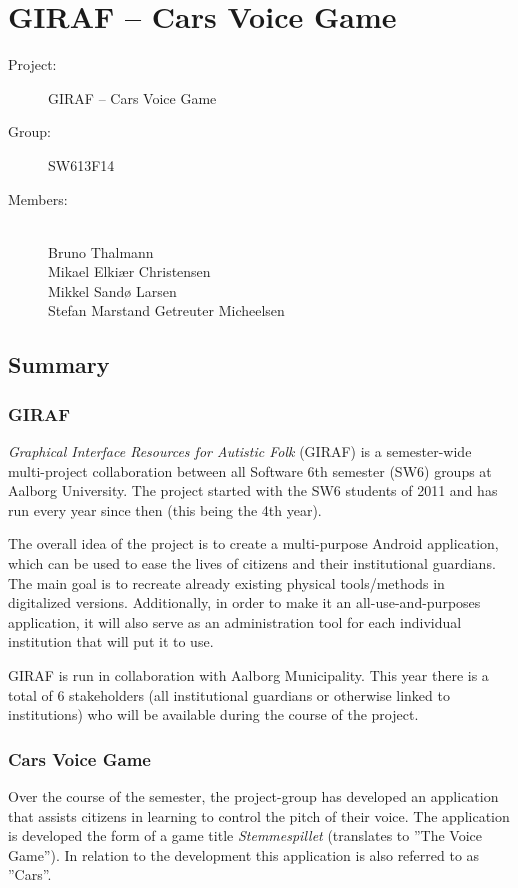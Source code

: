\documentclass[a4paper,12pt,english]{article}
\begin{document}
\section*{GIRAF -- Cars Voice Game}

\begin{description}
\item[Project:] GIRAF -- Cars Voice Game
\item[Group:] SW613F14
\item[Members:] ~ \\
	Bruno Thalmann \\
	Mikael Elki\ae r Christensen \\
	Mikkel Sand\o{} Larsen \\
	Stefan Marstand Getreuter Micheelsen
\end{description}

\subsection*{Summary}

\subsubsection*{GIRAF}
\textit{Graphical Interface Resources for Autistic Folk} (GIRAF) is a semester-wide multi-project collaboration between all Software 6th semester (SW6) groups at Aalborg University.
The project started with the SW6 students of 2011 and has run every year since then (this being the 4th year).

The overall idea of the project is to create a multi-purpose Android application, which can be used to ease the lives of citizens and their institutional guardians.
The main goal is to recreate already existing physical tools/methods in digitalized versions.
Additionally, in order to make it an all-use-and-purposes application, it will also serve as an administration tool for each individual institution that will put it to use.

GIRAF is run in collaboration with Aalborg Municipality.
This year there is a total of 6 stakeholders (all institutional guardians or otherwise linked to institutions) who will be available during the course of the project.

\subsubsection*{Cars Voice Game}
Over the course of the semester, the project-group has developed an application that assists citizens in learning to control the pitch of their voice.
The application is developed the form of a game title \textit{Stemmespillet} (translates to ''The Voice Game'').
In relation to the development this application is also referred to as ''Cars''.
\end{document}
